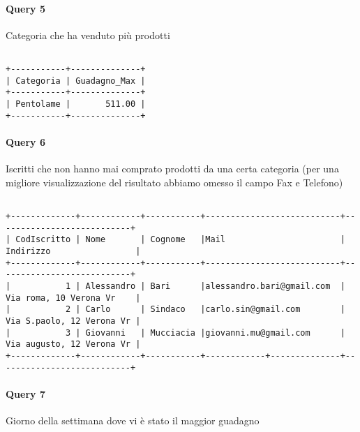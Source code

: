 

\paragraph*{Query 5}
Categoria che ha venduto pi\`u prodotti

\begin{verbatim}

+-----------+--------------+
| Categoria | Guadagno_Max |
+-----------+--------------+
| Pentolame |       511.00 |
+-----------+--------------+

\end{verbatim}



\paragraph*{Query 6}
Iscritti che non hanno mai comprato prodotti da una certa categoria (per una migliore visualizzazione del risultato abbiamo omesso il campo Fax e Telefono)

\begin{verbatim}

+-------------+------------+-----------+---------------------------+---------------------------+
| CodIscritto | Nome       | Cognome   |Mail                       | Indirizzo                 |
+-------------+------------+-----------+---------------------------+---------------------------+
|           1 | Alessandro | Bari      |alessandro.bari@gmail.com  | Via roma, 10 Verona Vr    |
|           2 | Carlo      | Sindaco   |carlo.sin@gmail.com        | Via S.paolo, 12 Verona Vr |
|           3 | Giovanni   | Mucciacia |giovanni.mu@gmail.com      | Via augusto, 12 Verona Vr |
+-------------+------------+-----------+------------+--------------+---------------------------+

\end{verbatim}



\paragraph*{Query 7}
Giorno della settimana dove vi \`e stato il maggior guadagno

